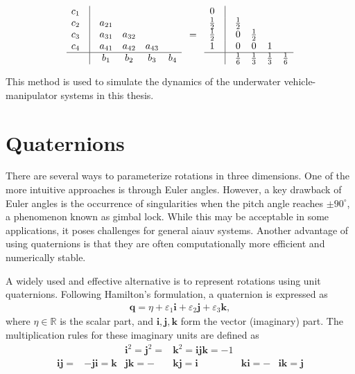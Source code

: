 \begin{align}
    \begin{matrix}
        c_1 & \vline & & & & \\
        c_2 & \vline & a_{21} & & & \\
        c_3 & \vline & a_{31} & a_{32} & & \\
        c_4 & \vline & a_{41} & a_{42} & a_{43} & \\
        \hline
        & \vline & b_1 & b_2 & b_3 & b_4
    \end{matrix}
    \quad=\quad 
    \begin{matrix}
        0 & \vline & & & & \\
        \frac{1}{2} & \vline & \frac{1}{2} & & & \\
        \frac{1}{2} & \vline & 0 & \frac{1}{2} & & \\
        1 & \vline & 0 & 0 & 1 & \\
        \hline
        & \vline & \frac{1}{6} & \frac{1}{3} & \frac{1}{3} & \frac{1}{6}
    \end{matrix}
\end{align}

This method is used to simulate the dynamics of the underwater vehicle-manipulator
systems in this thesis.

\section{Quaternions}

There are several ways to parameterize rotations in three dimensions. One of 
the more intuitive approaches is through Euler angles. However, a key drawback 
of Euler angles is the occurrence of singularities when the pitch angle 
reaches $\pm90^\circ$, a phenomenon known as gimbal lock. While this may be 
acceptable in some applications, it poses challenges for general \gls{aiauv} 
systems. Another advantage of using quaternions is that they are often computationally more efficient and numerically stable. 

A widely used and effective alternative is to represent rotations using unit 
quaternions. Following Hamilton’s formulation, a quaternion is expressed as
\begin{align}
    \bm{q} = \eta + \varepsilon_1 \bm{i} + \varepsilon_2 \bm{j} + \varepsilon_3 \bm{k},
\end{align}
where $\eta \in \mathbb{R}$ is the scalar part, and \(\bm{i}, \bm{j}, \bm{k}\) 
form the vector (imaginary) part. The multiplication rules for these imaginary 
units are defined as
\begin{align}
    && \bm{i}^2 = \bm{j}^2 = &\bm{k}^2 = \bm{i}\bm{j}\bm{k} = -1 &&\\
    \bm{i}\bm{j} = &-\bm{j}\bm{i} = \bm{k} & \bm{j}\bm{k} = -&\bm{k}\bm{j} = \bm{i} & \bm{k}\bm{i} = -&\bm{i}\bm{k} = \bm{j}
\end{align}

